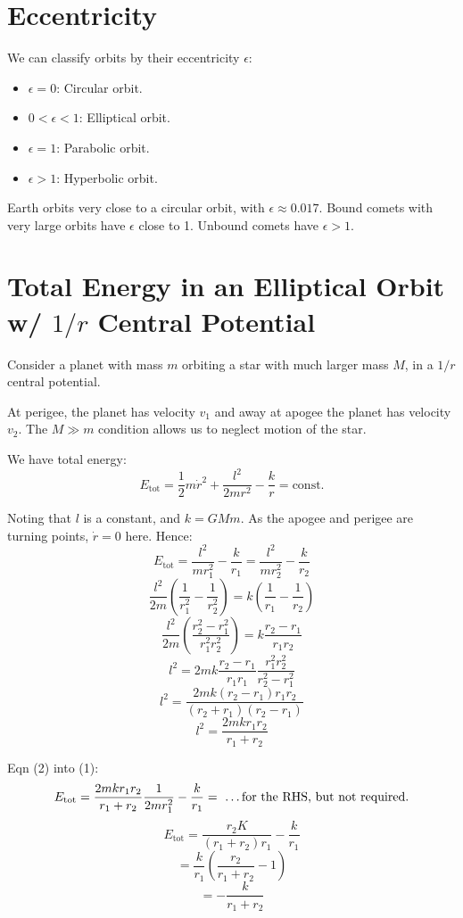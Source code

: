 
\section{Eccentricity}
We can classify orbits by their eccentricity $\epsilon$:
\begin{itemize}
    \item $\epsilon = 0$: Circular orbit.
    \item $0 < \epsilon < 1$: Elliptical orbit.
    \item $\epsilon = 1$: Parabolic orbit.
    \item $\epsilon > 1$: Hyperbolic orbit.
\end{itemize}

Earth orbits very close to a circular orbit, with $\epsilon \approx 0.017$. Bound comets with very large orbits have $\epsilon$ close to 1. Unbound comets have $\epsilon > 1$.

\section{Total Energy in an Elliptical Orbit w/ $1/r$ Central Potential}
Consider a planet with mass $m$ orbiting a star with much larger mass $M$, in a $1/r$ central potential.

At perigee, the planet has velocity $v_1$ and away at apogee the planet has velocity $v_2$. The $M \gg m$ condition allows us to neglect motion of the star.

We have total energy:
\[
    E_\text{tot} = \frac{1}{2}m \dot{r}^2 + \frac{l^2}{2mr^2} - \frac{k}{r} = \text{const.}
\]

Noting that $l$ is a constant, and $k = GMm$. As the apogee and perigee are turning points, $\dot{r} = 0$ here. Hence:
\[
    E_\text{tot} = \frac{l^2}{mr_1^2} - \frac{k}{r_1} = \frac{l^2}{mr_2^2} - \frac{k}{r_2} \tag{1}
\]
\[
    \frac{l^2}{2m} \left(\frac{1}{r_1^2} - \frac{1}{r_2^2}\right) = k\left( \frac{1}{r_1} - \frac{1}{r_2}\right)
\]
\[
    \frac{l^2}{2m} \left(\frac{r_2^2 - r_1^2}{r_1^2 r_2^2}\right) = k \frac{r_2 - r_1}{r_1 r_2}
\]
\[
    l^2 = 2mk \frac{r_2 - r_1}{r_1 r_1} \frac{r_1^2 r_2^2}{r_2^2 - r_1^2}
\]
\[
    l^2 = \frac{2mk (r_2 - r_1) r_1 r_2}{(r_2 + r_1) (r_2 - r_1)}
\]
\[
    l^2 = \frac{2mk r_1 r_2}{r_1 + r_2} \tag{2}
\]

Eqn (2) into (1):
\[
    E_\text{tot} = \frac{2mk r_1 r_2}{r_1 + r_2} \frac{1}{2mr_1^2} - \frac{k}{r_1} = \text{ \dots for the RHS, but not required.}
\]
\[
    E_\text{tot} = \frac{r_2 K}{(r_1 + r_2) r_1} - \frac{k}{r_1}
\]
\[
    = \frac{k}{r_1} \left(\frac{r_2}{r_1 + r_2} - 1\right)
\]
\[
    = - \frac{k}{r_1 + r_2}
\]

